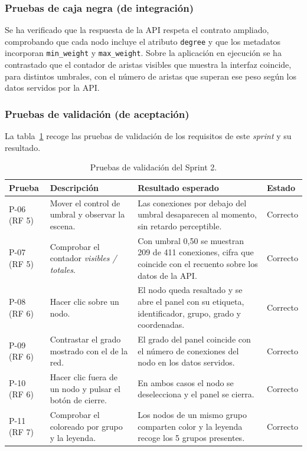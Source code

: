 \subsubsection*{Pruebas de caja negra (de integración)}

Se ha verificado que la respuesta de la API respeta el contrato ampliado, comprobando que cada nodo
incluye el atributo \texttt{degree} y que los metadatos incorporan \texttt{min\_weight} y
\texttt{max\_weight}. Sobre la aplicación en ejecución se ha contrastado que el contador de aristas
visibles que muestra la interfaz coincide, para distintos umbrales, con el número de aristas que
superan ese peso según los datos servidos por la API.

\subsubsection*{Pruebas de validación (de aceptación)}

La tabla~\ref{tab:pruebas-s2} recoge las pruebas de validación de los requisitos de este
\textit{sprint} y su resultado.

\begin{table}[H]
	\centering
	\caption{Pruebas de validación del Sprint 2.}
	\label{tab:pruebas-s2}
	\small
	\begin{tabularx}{\textwidth}{>{\raggedright\arraybackslash}p{1.5cm} >{\raggedright\arraybackslash}X >{\raggedright\arraybackslash}X >{\centering\arraybackslash}p{1.6cm}}
		\toprule
		\textbf{Prueba} & \textbf{Descripción} & \textbf{Resultado esperado} & \textbf{Estado} \\
		\midrule
		P-06 (RF 5) & Mover el control de umbral y observar la escena. &
			Las conexiones por debajo del umbral desaparecen al momento, sin retardo
			perceptible. & Correcto \\
		\addlinespace
		P-07 (RF 5) & Comprobar el contador \textit{visibles / totales}. &
			Con umbral 0,50 se muestran 209 de 411 conexiones, cifra que coincide con el recuento sobre
			los datos de la API. & Correcto \\
		\addlinespace
		P-08 (RF 6) & Hacer clic sobre un nodo. &
			El nodo queda resaltado y se abre el panel con su etiqueta, identificador, grupo, grado y
			coordenadas. & Correcto \\
		\addlinespace
		P-09 (RF 6) & Contrastar el grado mostrado con el de la red. &
			El grado del panel coincide con el número de conexiones del nodo en los datos servidos. &
			Correcto \\
		\addlinespace
		P-10 (RF 6) & Hacer clic fuera de un nodo y pulsar el botón de cierre. &
			En ambos casos el nodo se deselecciona y el panel se cierra. & Correcto \\
		\addlinespace
		P-11 (RF 7) & Comprobar el coloreado por grupo y la leyenda. &
			Los nodos de un mismo grupo comparten color y la leyenda recoge los 5 grupos presentes. &
			Correcto \\
		\bottomrule
	\end{tabularx}
\end{table}

